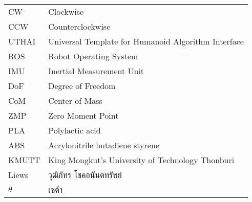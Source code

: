 \begin{abbreviations}
    \noindent
    \begin{tabular*}{\textwidth}{@{}p{}p{}@{}}
        {CW} & {Clockwise} \\
        {CCW} & {Counterclockwise} \\
        {UTHAI} & {Universal Template for Humanoid Algorithm Interface} \\
        {ROS} & {Robot Operating System} \\
        {IMU} & {Inertial Measurement Unit} \\
        {DoF} & {Degree of Freedom} \\
        {CoM} & {Center of Mass} \\
        {ZMP} & {Zero Moment Point} \\
        {PLA} & {Polylactic acid} \\
        {ABS} & {Acrylonitrile butadiene styrene} \\
        {KMUTT} & {King Mongkut's University of Technology Thonburi} \\
        {Liews} & {วุฒิภัทร โชคอนันตทรัพย์} \\
        {$\theta$} & {เซต้า}
    \end{tabular*}
\end{abbreviations}
